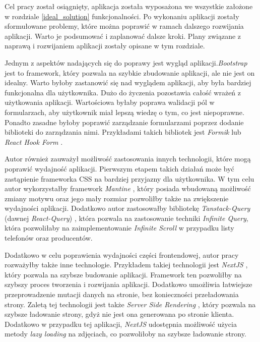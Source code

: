 Cel pracy został osiągnięty, aplikacja została wyposażona we wszystkie założone w rozdziale \ref{ideal_solution} funkcjonalności. Po wykonaniu aplikacji zostały sformułowane problemy, które można poprawić w ramach dalszego rozwijania aplikacji. Warto je podsumować i zaplanować dalsze kroki. Plany związane z naprawą i rozwijaniem aplikacji zostały opisane w tym rozdziale.

Jednym z aspektów nadających się do poprawy jest wygląd aplikacji.\linebreak\textit{Bootstrap} \cite{bootstrap} jest to framework, który pozwala na szybkie zbudowanie aplikacji, ale nie jest on idealny. Warto byłoby zastanowić się nad wyglądem aplikacji, aby była bardziej funkcjonalna dla użytkownika. Dużo do życzenia pozostawia całość wrażeń z użytkowania aplikacji. Wartościowa byłaby poprawa walidacji pól w formularzach, aby użytkownik miał lepszą wiedzę o tym, co jest niepoprawne. Ponadto zasadne byłoby poprawić zarządzanie formularzami poprzez dodanie biblioteki do zarządzania nimi. Przykładami takich bibliotek jest \textit{Formik} \cite{Formik} lub \linebreak \textit{React Hook Form} \cite{React_hook_form}. 

Autor również zauważył możliwość zastosowania innych technologii, które mogą poprawić wydajność aplikacji. Pierwszym etapem takich działań może być zastąpienie frameworka CSS na bardziej przyjazny dla użytkownika. W tym celu autor wykorzystałby framework \textit{Mantine} \cite{mantine}, który posiada wbudowaną możliwość zmiany motywu oraz jego mały rozmiar pozwoliłby także na zwiększenie wydajności aplikacji. Dodatkowo autor zastosowałby bibliotekę \textit{Tanstack-Query} (dawnej \textit{React-Query}) \cite{tanstack_query}, która pozwala na zastosowanie techniki \textit{Infinite Query}, która pozwoliłaby na zaimplementowanie \textit{Infinite Scroll} \cite{infinite_scroll} w przypadku listy telefonów oraz producentów.

Dodatkowo w celu poprawienia wydajności części frontendowej, autor pracy rozważyłby także inne technologie. Przykładem takiej technologii jest \textit{NextJS} \cite{nextjs}, który pozwala na szybsze budowanie aplikacji. Framework ten pozwoliłby na szybszy proces tworzenia i rozwijania aplikacji. Dodatkowo umożliwia łatwiejsze przeprowadzenie mutacji danych na stronie, bez konieczności przeładowania strony. Zaletą tej technologii jest także \textit{Server Side Rendering} \cite{SSR}, który pozwala na szybsze ładowanie strony, gdyż nie jest ona generowana po stronie klienta. Dodatkowo w przypadku tej aplikacji, \textit{NextJS} \cite{nextjs} udostępnia możliwość użycia metody \textit{lazy loading} na zdjęciach, co pozwoliłoby na szybsze ładowanie strony.

